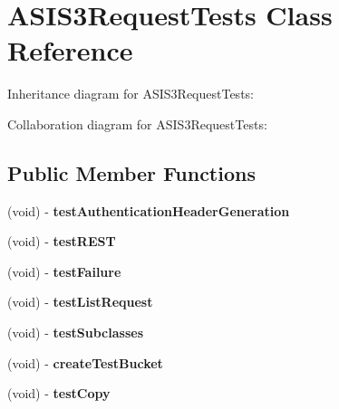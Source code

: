 \hypertarget{interface_a_s_i_s3_request_tests}{
\section{\-A\-S\-I\-S3\-Request\-Tests \-Class \-Reference}
\label{interface_a_s_i_s3_request_tests}
}


\-Inheritance diagram for \-A\-S\-I\-S3\-Request\-Tests\-:


\-Collaboration diagram for \-A\-S\-I\-S3\-Request\-Tests\-:
\subsection*{\-Public \-Member \-Functions}
\begin{DoxyCompactItemize}
\item 
\hypertarget{interface_a_s_i_s3_request_tests_a60bdada8e76611d7d565dff4b2cfd8a9}{
(void) -\/ {\bfseries test\-Authentication\-Header\-Generation}}
\label{interface_a_s_i_s3_request_tests_a60bdada8e76611d7d565dff4b2cfd8a9}

\item 
\hypertarget{interface_a_s_i_s3_request_tests_a8ca48a7b94614a7026f7b7862b722f89}{
(void) -\/ {\bfseries test\-R\-E\-S\-T}}
\label{interface_a_s_i_s3_request_tests_a8ca48a7b94614a7026f7b7862b722f89}

\item 
\hypertarget{interface_a_s_i_s3_request_tests_a91778029a97f36e77dad559977cdb550}{
(void) -\/ {\bfseries test\-Failure}}
\label{interface_a_s_i_s3_request_tests_a91778029a97f36e77dad559977cdb550}

\item 
\hypertarget{interface_a_s_i_s3_request_tests_adf56486c5a0e74cfdf0711c5fa016fb9}{
(void) -\/ {\bfseries test\-List\-Request}}
\label{interface_a_s_i_s3_request_tests_adf56486c5a0e74cfdf0711c5fa016fb9}

\item 
\hypertarget{interface_a_s_i_s3_request_tests_a7d8d7e21e0b483ca67889868688adb7d}{
(void) -\/ {\bfseries test\-Subclasses}}
\label{interface_a_s_i_s3_request_tests_a7d8d7e21e0b483ca67889868688adb7d}

\item 
\hypertarget{interface_a_s_i_s3_request_tests_a8cc7c1272f528811ee7d8f5e07fb1133}{
(void) -\/ {\bfseries create\-Test\-Bucket}}
\label{interface_a_s_i_s3_request_tests_a8cc7c1272f528811ee7d8f5e07fb1133}

\item 
\hypertarget{interface_a_s_i_s3_request_tests_a47ba82f8750aba0ef3928d442442e5c8}{
(void) -\/ {\bfseries test\-Copy}}
\label{interface_a_s_i_s3_request_tests_a47ba82f8750aba0ef3928d442442e5c8}


\end{DoxyCompactItemize}
